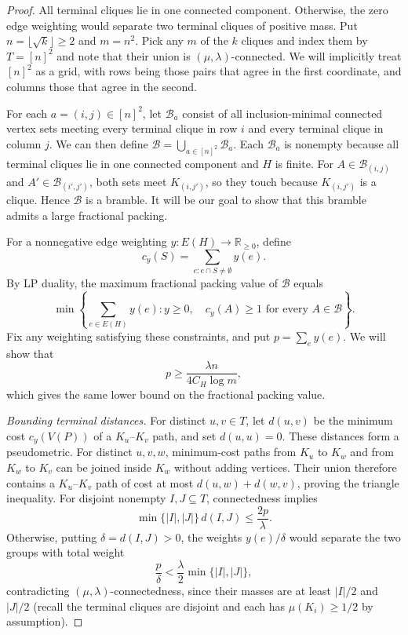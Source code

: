 \documentclass[11pt,letterpaper]{article}
\theoremstyle{definition}
\theoremstyle{remark}
\begin{document}
\begin{proof}
All terminal cliques lie in one connected component. Otherwise, the zero
edge weighting would separate two terminal cliques of positive mass.
Put $n=\lfloor\sqrt{k}\rfloor\ge2$ and $m=n^2$. Pick any $m$ of the $k$ cliques and index them by $T=[n]^2$ and note that their union is $(\mu,\lambda)$-connected. We will implicitly treat $[n]^2$ as a grid, with rows being those pairs that agree in the first coordinate, and columns those that agree in the second.

For each $a=(i,j)\in[n]^2$, let $\mathcal B_a$ consist of all
inclusion-minimal connected vertex sets meeting every terminal clique
in row $i$ and every terminal clique in column $j$. We can then define
\(
 \mathcal B=\bigcup_{a\in[n]^2}\mathcal B_a.
\)
Each $\mathcal B_a$ is nonempty because all terminal cliques lie in one
connected component and $H$ is finite. For $A\in\mathcal B_{(i,j)}$ and
$A'\in\mathcal B_{(i',j')}$, both sets meet $K_{(i,j')}$, so they touch
because $K_{(i,j')}$ is a clique. Hence $\mathcal B$ is a bramble. It will be our goal to show that this bramble admits a large fractional packing.

\smallskip
For a nonnegative edge weighting $y:E(H)\to\mathbb R_{\ge0}$, define
\[
 c_y(S)=\sum_{e:e\cap S\ne\emptyset}y(e).
\]
By LP duality, the maximum fractional packing value of $\mathcal B$ equals
\begin{equation}\label{eq:bramble-dual}
 \min\left\{\sum_{e\in E(H)}y(e):
 y\ge0,\quad c_y(A)\ge1\text{ for every }A\in\mathcal B\right\}.
\end{equation}
Fix any weighting satisfying these constraints, and put $p=\sum_e y(e)$.
We will show that
\[
 p\ge\frac{\lambda n}{4C_H\log m},
\]
which gives the same lower bound on the fractional packing value.

\smallskip
\textit{Bounding terminal distances.}
For distinct $u,v\in T$, let $d(u,v)$ be the minimum cost $c_y(V(P))$
of a $K_u$--$K_v$ path, and set $d(u,u)=0$. These distances form a
pseudometric. For distinct $u,v,w$, minimum-cost paths from $K_u$ to
$K_w$ and from $K_w$ to $K_v$ can be joined inside $K_w$ without adding
vertices. Their union therefore contains a $K_u$--$K_v$ path of cost
at most $d(u,w)+d(w,v)$, proving the triangle inequality.
%
For disjoint nonempty $I,J\subseteq T$, connectedness implies
\[
 \min\{|I|,|J|\}\,d(I,J)\le\frac{2p}{\lambda}.
\]
Otherwise, putting $\delta=d(I,J)>0$, the weights $y(e)/\delta$
would separate the two groups with total weight
\[
 \frac{p}{\delta}<\frac{\lambda}{2}\min\{|I|,|J|\},
\]
contradicting $(\mu,\lambda)$-connectedness, since their masses are
at least $|I|/2$ and $|J|/2$ (recall the terminal cliques are disjoint and each has $\mu(K_i) \ge 1/2$ by assumption).


\end{proof}
\end{document}
